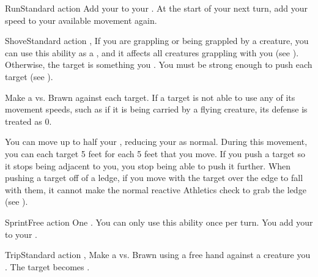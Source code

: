   \begin{activeability}{Run}{Standard action}
    \rankline
    Add your  to your .
    At the start of your next turn, add your speed to your available movement again.
  \end{activeability}

  \begin{activeability}{Shove}{Standard action}
    \abilitytags \atBrawling, \atPhysical
    \rankline
    If you are grappling or being grappled by a creature, you can use this ability as a , and it affects all creatures grappling with you (see ).
    Otherwise, the target is something you .
    You must be strong enough to push each target (see ).

    Make a  vs. Brawn against each target.
    If a target is not able to use any of its movement speeds, such as if it is being carried by a flying creature, its defense is treated as 0.

    \hit You can move up to half your , reducing your  as normal.
    During this movement, you can  each target 5 feet for each 5 feet that you move.
    If you push a target so it stops being adjacent to you, you stop being able to push it further.
    When pushing a target off of a ledge, if you move with the target over the edge to fall with them, it cannot make the normal reactive Athletics check to grab the ledge (see ).
  \end{activeability}

  \begin{activeability}{Sprint}{Free action}
    \abilitycost One . You can only use this ability once per turn.
    \rankline
    You add your  to your .
  \end{activeability}

  \begin{activeability}{Trip}{Standard action}
    \abilitytags \atBrawling, \atPhysical
    \rankline
    Make a  vs. Brawn using a free hand against a creature you .
    \hit The target becomes \prone.
  \end{activeability}

